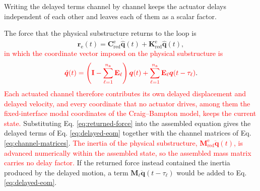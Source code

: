 \documentclass[11pt,a4paper]{article}
\numberwithin{equation}{section}
\newcommand{\rev}[1]{\textcolor{red}{#1}}
\begin{document}
Writing the delayed terms channel by channel keeps the actuator delays independent of each other and leaves each of them as a scalar factor.

The force that the physical substructure returns to the loop is
\begin{equation}
	\bm{r}_{\mathrm{e}}(t)=\mathbf{C}_{\mathrm{red}}^{\mathrm{e}}\dot{\hat{\bm{q}}}(t)
	+\mathbf{K}_{\mathrm{red}}^{\mathrm{e}}\hat{\bm{q}}(t),
	\label{eq:returned-force}
\end{equation}
\rev{in which the coordinate vector imposed on the physical substructure is}
\begin{equation}
	\rev{\hat{\bm{q}}(t)=
		\left(\mathbf{I}-\sum_{\ell=1}^{n_{\mathrm{a}}}\mathbf{E}_{\ell}\right)\bm{q}(t)
		+\sum_{\ell=1}^{n_{\mathrm{a}}}\mathbf{E}_{\ell}\bm{q}(t-\tau_{\ell})}.
	\label{eq:imposed-coordinates}
\end{equation}
\rev{Each actuated channel therefore contributes its own delayed displacement and delayed velocity, and every coordinate that no actuator drives, among them the fixed-interface modal coordinates of the Craig--Bampton model, keeps the current state.} Substituting Eq. \eqref{eq:returned-force} into the assembled equation gives the delayed terms of Eq. \eqref{eq:delayed-eom} together with the channel matrices of Eq. \eqref{eq:channel-matrices}. \rev{The inertia of the physical substructure, \(\mathbf{M}_{\mathrm{red}}^{\mathrm{e}}\ddot{\bm{q}}(t)\), is advanced numerically within the assembled state, so the assembled mass matrix carries no delay factor.} If the returned force instead contained the inertia produced by the delayed motion, a term \(\mathbf{M}_{\ell}\ddot{\bm{q}}(t-\tau_{\ell})\) would be added to Eq. \eqref{eq:delayed-eom}.
\end{document}
